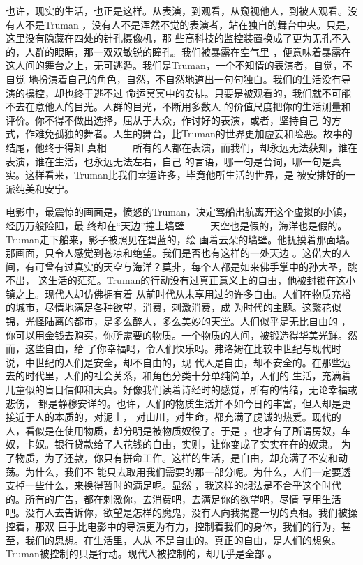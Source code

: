 \documentclass[12pt,a4paper]{article}
\begin{document}
		也许，现实的生活，也正是这样。从表演，到观看，从窥视他人，到被人观看。没有人不是Truman
	，没有人不是浑然不觉的表演者，站在独自的舞台中央。只是，这里没有隐藏在四处的针孔摄像机，那
	些高科技的监控装置换成了更为无孔不入的，人群的眼睛，那一双双敏锐的瞳孔。我们被暴露在空气里
	，便意味着暴露在这人间的舞台之上，无可逃遁。我们是Truman，一个不知情的表演者，自觉，不自觉
	地扮演着自己的角色，自然，不自然地道出一句句独白。我们的生活没有导演的操控，却也终于逃不过
	命运冥冥中的安排。只要是被观看的，我们就不可能不去在意他人的目光。人群的目光，不断用多数人
	的价值尺度把你的生活测量和评价。你不得不做出选择，屈从于大众，作讨好的表演，或者，坚持自己
	的方式，作难免孤独的舞者。人生的舞台，比Truman的世界更加虚妄和险恶。故事的结尾，他终于得知
	真相 —— 所有的人都在表演，而我们，却永远无法获知，谁在表演，谁在生活，也永远无法左右，自己
	的言语，哪一句是台词，哪一句是真实。这样看来，Truman比我们幸运许多，毕竟他所生活的世界，是
	被安排好的一派纯美和安宁。


		电影中，最震惊的画面是，愤怒的Truman，决定驾船出航离开这个虚拟的小镇，经历万般险阻，最
	终却在“天边”撞上墙壁 —— 天空也是假的，海洋也是假的。Truman走下船来，影子被照见在碧蓝的，绘
	画着云朵的墙壁。他抚摸着那面墙。那画面，只令人感觉到苍凉和绝望。我们是否也有这样的一处天边
	。这偌大的人间，有可曾有过真实的天空与海洋？莫非，每个人都是如来佛手掌中的孙大圣，跳不出，
	这生活的茫茫。Truman的行动没有过真正意义上的自由，他被封锁在这小镇之上。现代人却仿佛拥有着
	从前时代从未享用过的许多自由。人们在物质充裕的城市，尽情地满足各种欲望，消费，刺激消费，成
	为时代的主题。这繁花似锦，光怪陆离的都市，是多么醉人，多么美妙的天堂。人们似乎是无比自由的
	，你可以用金钱去购买，你所需要的物质。一个物质的人间，被锻造得华美光鲜。然而，这些自由，给
	了你幸福吗，令人们快乐吗。弗洛姆在比较中世纪与现代时说，中世纪的人们是安全，却不自由的，现
	代人是自由，却不安全的。在那些远去的时代里，人们的社会关系，和角色分类十分单纯简单，人们的
	生活，充满着儿童似的盲目信仰和天真。好像我们读着诗经时的感觉，所有的情绪，无论幸福或悲伤，
	都是静穆安详的。也许，人们的物质生活并不如今日的丰富，但人却是更接近于人的本质的，对泥土，
	对山川，对生命，都充满了虔诚的热爱。现代的人，看似是在使用物质，却分明是被物质奴役了。于是
	，也才有了所谓房奴，车奴，卡奴。银行贷款给了人花钱的自由，实则，让你变成了实实在在的奴隶。
	为了物质，为了还款，你只有拼命工作。这样的生活，是自由，却充满了不安和动荡。为什么，我们不
	能只去取用我们需要的那一部分呢。为什么，人们一定要透支掉一些什么，来换得暂时的满足呢。显然
	，我这样的想法是不合乎这个时代的。所有的广告，都在刺激你，去消费吧，去满足你的欲望吧，尽情
	享用生活吧。没有人去告诉你，欲望是怎样的魔鬼，没有人向我揭露一切的真相。我们被操控着，那双
	巨手比电影中的导演更为有力，控制着我们的身体，我们的行为，甚至，我们的思想。在生活里，人从
	不是自由的。真正的自由，是人们的想象。Truman被控制的只是行动。现代人被控制的，却几乎是全部
	。
\end{document}
